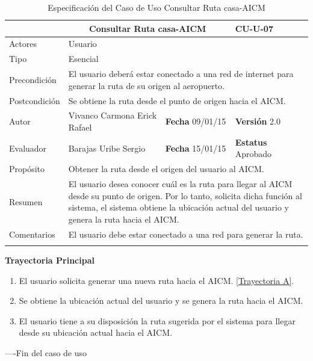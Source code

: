 \begin{longtable}{|p{2.5cm}|p{6.4cm}|p{2cm}|p{2cm}|}
	\hline
		\rowcolor[RGB]{51,153,255}{Caso de Uso}&\multicolumn{2}{c}{Consultar Ruta casa-AICM}&{\textbf{CU-U-07}}\\
	\hline
		{Actores}&\multicolumn{3}{p{11.2cm}|}{Usuario}\\
	\hline
		{Tipo}&\multicolumn{3}{p{11.2cm}|}{Esencial}\\
	\hline
		{Precondición}&\multicolumn{3}{p{11.2cm}|}{El usuario deberá estar conectado a una red de internet para generar la ruta de su origen al aeropuerto.}\\
	\hline
		{Postcondición}&\multicolumn{3}{p{11.2cm}|}{Se obtiene la ruta desde el punto de origen hacia el AICM.}\\
	\hline
		{Autor}&{Vivanco Carmona Erick Rafael}&{\textbf{Fecha} 09/01/15}&{\textbf{Versión} 2.0}\\
			\hline
		{Evaluador}&{Barajas Uribe Sergio}&{\textbf{Fecha} 15/01/15}&{\textbf{Estatus} Aprobado}\\
	\hline
		{Propósito}&\multicolumn{3}{p{11.2cm}|}{Obtener la ruta desde el origen del usuario al AICM.}\\
	\hline
		{Resumen}&\multicolumn{3}{p{11.2cm}|}{El usuario desea conocer cuál es la ruta para llegar al AICM desde su punto de origen. Por lo tanto, solicita dicha función al sistema, el sistema obtiene la ubicación actual del usuario y  genera la ruta hacia el AICM.}\\	
	\hline
		{Comentarios}&\multicolumn{3}{p{11.2cm}|}{El usuario debe estar conectado a una red para generar la ruta.}\\
	\hline
	\caption[Especificación del Caso de Uso Consultar Ruta casa-AICM]{Especificación del Caso de Uso Consultar Ruta casa-AICM}
    	\label{tab:cuConsultarRutacasa-AICM}
\end{longtable}
\clearpage

\begin{flushleft}
	\textbf{Trayectoria Principal}\\
	\begin{enumerate}
		\item El usuario solicita generar una nueva ruta hacia el AICM. \hyperlink{TrayectoriaA_CU-U-07}{[Trayectoria A]}.
		\item Se obtiene la ubicación actual del usuario y se genera la ruta hacia el AICM.
		\item El usuario tiene a su disposición la ruta sugerida por el sistema para llegar desde su ubicación actual hacia el AICM.
	\end{enumerate}
\end{flushleft}
----Fin del caso de uso


